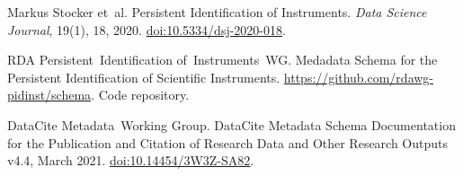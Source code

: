 \documentclass[titlepage=true,twoside=false,DIV=13]{scrartcl}
\begin{document}
%
%
\begin{thebibliography}{1}

Markus Stocker et~al.
\newblock Persistent Identification of Instruments.
\newblock \emph{Data Science Journal}, 19(1), 18, 2020.
\newblock \href{https://doi.org/10.5334/dsj-2020-018}{doi:10.5334/dsj-2020-018}.

RDA Persistent~Identification of~Instruments~WG.
\newblock Medadata Schema for the Persistent Identification of Scientific
  Instruments.
\newblock \url{https://github.com/rdawg-pidinst/schema}.
\newblock Code repository.

DataCite Metadata~Working Group.
\newblock DataCite Metadata Schema Documentation for the Publication and
  Citation of Research Data and Other Research Outputs v4.4, March 2021.
\newblock \href{https://doi.org/10.14454/3W3Z-SA82}{doi:10.14454/3W3Z-SA82}.

\end{thebibliography}
\end{document}
